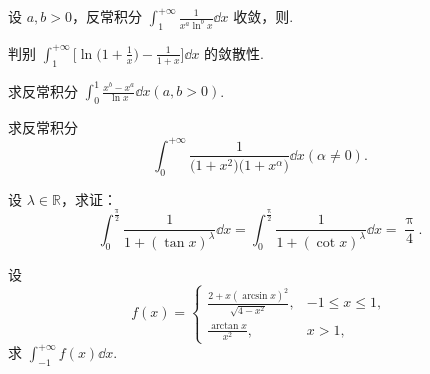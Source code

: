 	\begin{ti}
		设 $a, b > 0$，反常积分 $\int_{1}^{+\infty} \frac{1}{x^{a} \ln^{b}x} \dd{x}$ 收敛，则\kuo.

	\end{ti}

	\begin{ti}
		判别 $\int_{1}^{+\infty} \bigl[ \ln \bigl( 1 + \frac{1}{x} \bigr) - \frac{1}{1 + x} \bigr] \dd{x}$ 的敛散性.
	\end{ti}

	\begin{ti}
		求反常积分 $\int_{0}^{1} \frac{x^{b} - x^{a}}{\ln x} \dd{x} (a,b > 0)$.
	\end{ti}

	\begin{ti}
		求反常积分
		\[
			\int_{0}^{+\infty} \frac{1}{ \bigl(1 + x^{2}\bigr) \bigl(1 + x^{\alpha}\bigr) } \dd{x} (\alpha \ne 0).
		\]
	\end{ti}

	\begin{ti}
		设 $\lambda \in \mathbb{R}$，求证：
		\[
			\int_{0}^{\frac{\uppi}{2}} \frac{1}{1 + (\tan x)^{\lambda}} \dd{x} = \int_{0}^{\frac{\uppi}{2}} \frac{1}{1 + (\cot x)^{\lambda}} \dd{x} = \frac{\uppi}{4}.
		\]
	\end{ti}

	\begin{ti}
		设
		\[
			f(x) = \begin{cases}
				\frac{ 2 + x (\arcsin x)^{2} }{\sqrt{4 - x^{2}}}, & -1 \leq x \leq 1,\\
				\frac{\arctan x}{x^{2}}, & x > 1,
			\end{cases}
		\]
		求 $\int_{-1}^{+\infty} f(x) \dd{x}$.
	\end{ti}